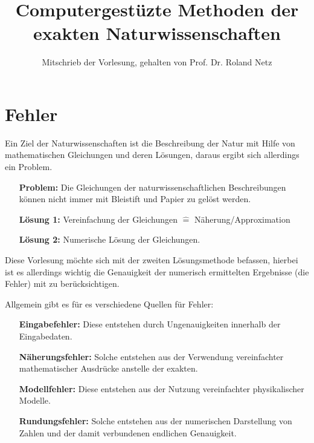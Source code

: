 \documentclass{scrartcl}
\begin{document}
\title{Computergestüzte Methoden der exakten Naturwissenschaften}
\author{Mitschrieb der Vorlesung, gehalten von Prof. Dr. Roland Netz}           
\maketitle
\tableofcontents
\newpage

\section{Fehler}
Ein Ziel der Naturwissenschaften ist die Beschreibung der Natur mit Hilfe von mathematischen Gleichungen und deren Lösungen, daraus ergibt sich allerdings ein Problem.
\begin{itemize}
\item[\textbf{Problem:}] Die Gleichungen der naturwissenschaftlichen  Beschreibungen können nicht immer mit Bleistift und Papier zu gelöst werden.
\item[\textbf{Lösung 1:}] Vereinfachung der Gleichungen $\hat{=}$ Näherung/Approximation
\item[\textbf{Lösung 2:}] Numerische Lösung der Gleichungen.
\end{itemize}
Diese Vorlesung möchte sich mit der zweiten Lösungsmethode befassen, hierbei ist es allerdings wichtig die Genauigkeit der numerisch ermittelten Ergebnisse (die Fehler) mit zu berücksichtigen.

  Allgemein gibt es für es verschiedene Quellen für Fehler:
\begin{itemize}
 \item[\textbf{Eingabefehler:}] Diese entstehen durch Ungenauigkeiten innerhalb der Eingabedaten.
  \item[\textbf{Näherungsfehler:}] Solche entstehen aus der Verwendung vereinfachter mathematischer Ausdrücke anstelle der exakten.
  \item[\textbf{Modellfehler:}] Diese entstehen aus der Nutzung vereinfachter physikalischer Modelle.
  \item[\textbf{Rundungsfehler:}] Solche entstehen aus der numerischen Darstellung von Zahlen und der damit verbundenen endlichen Genauigkeit.
\end{itemize}
\end{document}
